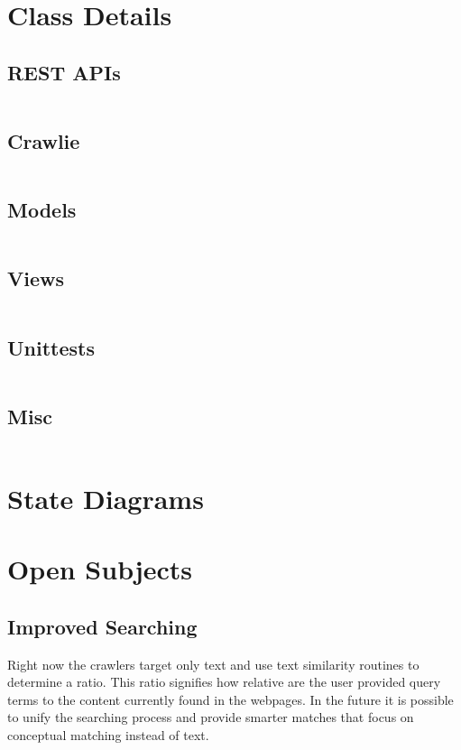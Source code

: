 \chapter{Class Details}
    \section{REST APIs}
    \inputminted[linenos,fontsize=\scriptsize,frame=leftline]{text}{files/api}
    \section{Crawlie}
    \inputminted[linenos,fontsize=\scriptsize,frame=leftline]{text}{files/crawlie}
    \section{Models}
    \inputminted[linenos,fontsize=\scriptsize,frame=leftline]{text}{files/models}
    \section{Views}
    \inputminted[linenos,fontsize=\scriptsize,frame=leftline]{text}{files/views}
    \section{Unittests}
    \inputminted[linenos,fontsize=\scriptsize,frame=leftline]{text}{files/unittests}
    \section{Misc}
    \inputminted[linenos,fontsize=\scriptsize,frame=leftline]{text}{files/tags}

\chapter{State Diagrams}

\chapter{Open Subjects}
    \section{Improved Searching}
        Right now the crawlers target only text and use text similarity
        routines to determine a ratio. This ratio signifies how relative are
        the user provided query terms to the content currently found in the
        webpages. In the future it is possible to unify the searching process
        and provide smarter matches that focus on conceptual matching instead
        of text.
